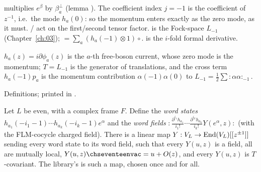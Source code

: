 \begin{dictionary}
 multiplies $e^\beta$ by $\beta^\perp_a$ (lemma ).  The
coefficient index $j=-1$ is the coefficient of $z^{-1}$, i.e.\ the mode $h_a(0)$: so the momentum enters
exactly as the zero mode, as it must.  / act on the first/second tensor factor.
 is the Fock-space $L_{-1}$ (Chapter~\ref{ch:03}); 
$=\sum_a(h_a(-1)\otimes1)\circ$.   is the $i$-fold formal derivative.
\end{dictionary}

\begin{physics}
$h_a(z)=i\partial\phi_a(z)$ is the $a$-th free-boson current, whose zero mode is the momentum; $T=L_{-1}$ is
the generator of translations, and the cross term $h_a(-1)p_a$ is the momentum contribution
$\alpha(-1)\alpha(0)$ to $L_{-1}=\frac12\sum{:}\alpha\alpha{:}_{-1}$.
\end{physics}

\begin{status}
Definitions; printed in .
\end{status}

\begin{theorem}\label{ch17:thm:reconstruct}
Let $L$ be even, with a complex frame $F$.  Define the \emph{word states}
$h_{a_1}(-i_1-1)\cdots h_{a_k}(-i_k-1)e^\alpha$ and the \emph{word fields}
${:}\tfrac{\partial^{i_1}h_{a_1}}{i_1!}\cdots\tfrac{\partial^{i_k}h_{a_k}}{i_k!}Y(e^\alpha,z){:}$ (with the FLM-cocycle charged
field).  There is a linear map $Y:V_L\to\operatorname{End}(V_L)[[z^{\pm1}]]$ sending every word state to its word field,
such that every $Y(u,z)$ is a field, all are mutually local, $Y(u,z)\chseventeenvac=u+O(z)$, and every $Y(u,z)$ is
$T$-covariant.  The library's  is such a map, chosen once and for all.
\end{theorem}

